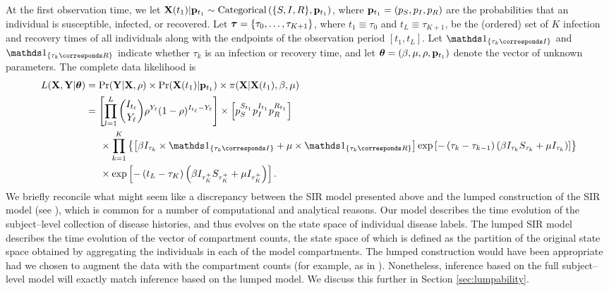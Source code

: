 At the first observation time, we let $ \mathbf{X}(t_1)|\mathbf{p}_{t_1} \sim \mathrm{Categorical}\left (\lbrace S,I,R\rbrace, \mathbf{p}_{t_1}\right ) $, where $ \mathbf{p}_{t_1}=\left(p_{S}, p_{I},p_{R}\right) $ are the probabilities that an individual is susceptible, infected, or recovered. Let $ \boldsymbol{\tau} = \lbrace\tau_0,\dots,\tau_{K+1}\rbrace $, where $ t_1 \equiv \tau_0 $ and $ t_L \equiv \tau_{K+1} $, be the (ordered) set of $ K $ infection and recovery times of all individuals along with the endpoints of the observation period $ [t_1,t_L] $. Let $ \ind{\tau_k \corresponds I} $ and $ \ind{\tau_k \corresponds R} $ indicate whether $ \tau_k $ is an infection or recovery time, and let $ \boldsymbol{\theta} = (\beta, \mu, \rho, \mathbf{p}_{t_1}) $ denote the vector of unknown parameters. The complete data likelihood is 
\begin{align} 
\label{eqn:bda_comp_data_likelihood}
L(\bX, \bY | \btheta) &= \Pr(\bY|\bX, \rho)\times \Pr(\bX(t_1)|\bp_{t_1}) \times \pi(\bX |\bX(t_1),\beta, \mu) \nonumber \\
&=  \left [ \prod_{l = 1}^{L}\binom{I_{t_\ell}}{Y_\ell}  \rho^{Y_\ell}(1-\rho)^{I_{t_\ell} - Y_\ell}\right ] \times \left [p_{S}^{S_{t_1}} p_{I}^{I_{t_1}}p_{R}^{R_{t_1}}\right ]  \nonumber\\
&\hspace{0.2in} \times \prod_{k = 1}^{K}\left \lbrace \left [\beta I_{\tau_k}\times\ind{\tau_k \corresponds I} + \mu\times\ind{\tau_k \corresponds R}\right ] \exp{\left [-\left (\tau_k - \tau_{k-1}\right )\left (\beta I_{\tau_k} S_{\tau_k} + \mu I_{\tau_k}\right )\right ]}\right \rbrace \nonumber \\
& \hspace{0.2in} \times \exp \left [-\left (t_L - \tau_K\right )\left (\beta I_{\tau_K^+}S_{\tau_K^+} + \mu I_{\tau_K^+}\right )\right ]. 
\end{align}
We briefly reconcile what might seem like a discrepancy between the SIR model presented above and the lumped construction of the SIR model (see \cite{andersson2000stochastic}), which is common for a number of computational and analytical reasons. Our model describes the time evolution of the subject--level collection of disease histories, and thus evolves on the state space of individual disease labels. The lumped SIR model describes the time evolution of the vector of compartment counts, the state space of which is defined as the partition of the original state space obtained by aggregating the individuals in each of the model compartments. The lumped construction would have been appropriate had we chosen to augment the data with the compartment counts (for example, as in \cite{pooley2015}). Nonetheless, inference based on the full subject--level model will exactly match inference based on the lumped model. We discuss this further in Section \ref{sec:lumpability}.

